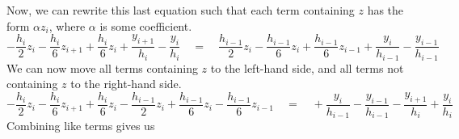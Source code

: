 \documentclass[letterpaper, 10pt, titlepage]{article}
\begin{document}
Now, we can rewrite this last equation such that each term containing $z$ has
the form $\alpha z_i$, where $\alpha$ is some coefficient.
\begin{equation}
    - \dfrac{h_{i}}{2}z_i
    - \dfrac{h_{i}}{6}z_{i+1}
    + \dfrac{h_{i}}{6}z_i
    + \dfrac{y_{i+1}}{h_i}
    - \dfrac{y_i}{h_i}
    \quad=\quad
    \dfrac{h_{i-1}}{2}z_{i}
    - \dfrac{h_{i-1}}{6}z_{i}
    + \dfrac{h_{i-1}}{6}z_{i-1}
    + \dfrac{y_{i}}{h_{i-1}}
    - \dfrac{y_{i-1}}{h_{i-1}}
\end{equation}
We can now move all terms containing $z$ to the left-hand side, and all terms
not containing $z$ to the right-hand side.
\begin{equation}
    - \dfrac{h_{i}}{2}z_i
    - \dfrac{h_{i}}{6}z_{i+1}
    + \dfrac{h_{i}}{6}z_i
    - \dfrac{h_{i-1}}{2}z_{i}
    + \dfrac{h_{i-1}}{6}z_{i}
    - \dfrac{h_{i-1}}{6}z_{i-1}
    \quad=\quad
    + \dfrac{y_{i}}{h_{i-1}}
    - \dfrac{y_{i-1}}{h_{i-1}}
    - \dfrac{y_{i+1}}{h_i}
    + \dfrac{y_i}{h_i}
\end{equation}
Combining like terms gives us
\end{document}
